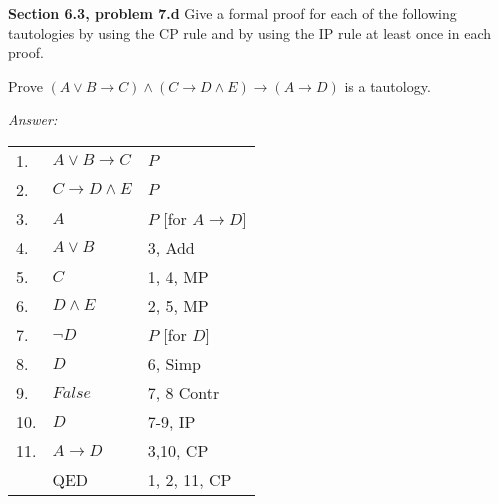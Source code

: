 \documentclass[12pt]{article}
\begin{document}
\textbf{Section 6.3, problem 7.d}  Give a formal proof for each of the
following tautologies by using the CP rule and by using the IP rule at
least once in each proof.

Prove $ (A \lor B \rightarrow C) \land (C \rightarrow D \land E) \rightarrow (A \rightarrow D)$ is a tautology.


\emph{Answer:} 

\begin{tabular}{p{.8cm}p{8.5cm}l}
1. & $A \lor B \rightarrow C$ & $P$ \\
2. & $C \rightarrow D \land E$ & $P$ \\
3. & \qquad $A$ & $P$ [for $A \rightarrow D$] \\
4. & \qquad  $A \lor B$ & 3, Add \\
5. & \qquad $C$ & 1, 4, MP \\
6. & \qquad $D \land E$ & 2, 5, MP \\
7. & \qquad \qquad $\neg D$ & $P$ [for $D$] \\
8. & \qquad \qquad $D$ & 6, Simp \\
9. & \qquad \qquad  $False$ & 7, 8 Contr \\
10.& \qquad $D$ & 7-9, IP \\
11.& $A \rightarrow D$ & 3,10, CP \\
& QED & 1, 2, 11, CP \\
\end{tabular}
\end{document}

